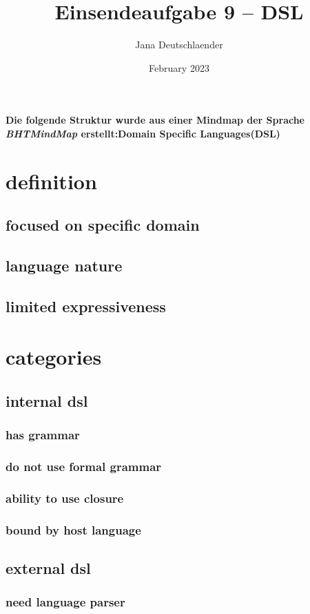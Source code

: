 \documentclass{article}
\title{Einsendeaufgabe 9 – DSL}
\author{Jana Deutschlaender}
\date{February 2023}
\begin{document}
\maketitle
\paragraph{Die folgende Struktur wurde aus einer Mindmap der Sprache \emph{BHTMindMap} erstellt:Domain Specific Languages(DSL)}
\section{definition}
\subsection{focused on specific domain}
\subsection{language nature }
\subsection{limited expressiveness }
\section{categories}
\subsection{internal dsl}
\subsubsection{has grammar}
\subsubsection{do not use formal grammar}
\subsubsection{ability to use closure}
\subsubsection{bound by host language}
\subsection{external dsl }
\subsubsection{need language parser}
\end{document}
